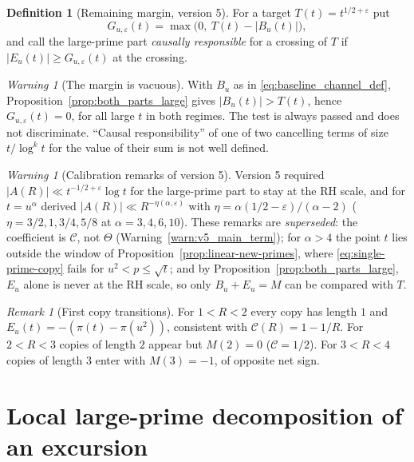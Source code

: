 \documentclass[11pt]{amsart}
\numberwithin{equation}{section}
\theoremstyle{plain}
\theoremstyle{definition}
\newtheorem{definition}[theorem]{Definition}
\theoremstyle{remark}
\newtheorem{remark}[theorem]{Remark}
\newtheorem{warning}[theorem]{Warning}
\newcommand{\eps}{\varepsilon}
\newcommand{\Cc}{\mathcal{C}}
\begin{document}
\begin{definition}[Remaining margin, version 5]
\label{def:remaining-margin}
For a target $T(t)=t^{1/2+\eps}$ put
\begin{equation}
\label{eq:margin-def}
  G_{u,\eps}(t)=\max\bigl(0,\ T(t)-|B_u(t)|\bigr),
\end{equation}
and call the large-prime part \emph{causally responsible} for a crossing of
$T$ if $|E_u(t)|\ge G_{u,\eps}(t)$ at the crossing.
\end{definition}

\begin{warning}[The margin is vacuous]
\label{warn:margin_vacuous}
With $B_u$ as in \eqref{eq:baseline_channel_def},
Proposition~\ref{prop:both_parts_large} gives $|B_u(t)|>T(t)$, hence
$G_{u,\eps}(t)=0$, for all large $t$ in both regimes. The test is always
passed and does not discriminate. ``Causal responsibility'' of one of two
cancelling terms of size $t/\log^kt$ for the value of their sum is not well
defined.
\end{warning}

\begin{warning}[Calibration remarks of version 5]
\label{warn:v5_calibration}
Version 5 required $|A(R)|\ll t^{-1/2+\eps}\log t$ for the large-prime part
to stay at the RH scale, and for $t=u^\alpha$ derived
$|A(R)|\ll R^{-\eta(\alpha,\eps)}$ with
$\eta=\alpha(1/2-\eps)/(\alpha-2)$ ($\eta=3/2,1,3/4,5/8$ at
$\alpha=3,4,6,10$). These remarks are \emph{superseded}: the coefficient is
$\Cc$, not $\Theta$ (Warning~\ref{warn:v5_main_term}); for $\alpha>4$ the
point $t$ lies outside the window of
Proposition~\ref{prop:linear-new-primes}, where
\eqref{eq:single-prime-copy} fails for $u^2<p\le\sqrt t$; and by
Proposition~\ref{prop:both_parts_large}, $E_u$ alone is never at the RH
scale, so only $B_u+E_u=M$ can be compared with $T$.
\end{warning}

\begin{remark}[First copy transitions]
\label{rem:first-copy-transitions}
For $1<R<2$ every copy has length $1$ and
$E_u(t)=-(\pi(t)-\pi(u^2))$, consistent with $\Cc(R)=1-1/R$. For $2<R<3$
copies of length $2$ appear but $M(2)=0$ ($\Cc=1/2$). For $3<R<4$ copies of
length $3$ enter with $M(3)=-1$, of opposite net sign.
\end{remark}

\section{Local large-prime decomposition of an excursion}
\label{sec:local_large_prime}
\end{document}
